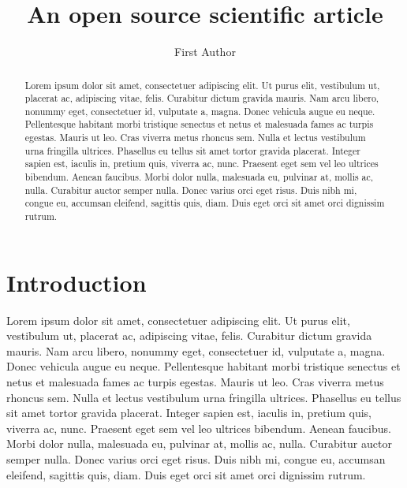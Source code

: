 \documentclass[twocolumn]{aastex631}
\begin{document}
\title{An open source scientific article}

\author{First Author}

\begin{abstract}
    Lorem ipsum dolor sit amet, consectetuer adipiscing elit. 
    Ut purus elit, vestibulum ut, placerat ac, adipiscing vitae, felis. 
    Curabitur dictum gravida mauris. 
    Nam arcu libero, nonummy eget, consectetuer id, vulputate a, magna. 
    Donec vehicula augue eu neque. 
    Pellentesque habitant morbi tristique senectus et netus et malesuada fames ac turpis egestas. 
    Mauris ut leo. 
    Cras viverra metus rhoncus sem. 
    Nulla et lectus vestibulum urna fringilla ultrices. 
    Phasellus eu tellus sit amet tortor gravida placerat. 
    Integer sapien est, iaculis in, pretium quis, viverra ac, nunc. 
    Praesent eget sem vel leo ultrices bibendum. 
    Aenean faucibus. 
    Morbi dolor nulla, malesuada eu, pulvinar at, mollis ac, nulla. 
    Curabitur auctor semper nulla. 
    Donec varius orci eget risus. 
    Duis nibh mi, congue eu, accumsan eleifend, sagittis quis, diam. 
    Duis eget orci sit amet orci dignissim rutrum.
\end{abstract}

\section{Introduction}
Lorem ipsum dolor sit amet, consectetuer adipiscing elit. 
Ut purus elit, vestibulum ut, placerat ac, adipiscing vitae, felis. 
Curabitur dictum gravida mauris. 
Nam arcu libero, nonummy eget, consectetuer id, vulputate a, magna. 
Donec vehicula augue eu neque. 
Pellentesque habitant morbi tristique senectus et netus et malesuada fames ac turpis egestas. 
Mauris ut leo. 
Cras viverra metus rhoncus sem. 
Nulla et lectus vestibulum urna fringilla ultrices. 
Phasellus eu tellus sit amet tortor gravida placerat. 
Integer sapien est, iaculis in, pretium quis, viverra ac, nunc. 
Praesent eget sem vel leo ultrices bibendum. 
Aenean faucibus. 
Morbi dolor nulla, malesuada eu, pulvinar at, mollis ac, nulla. 
Curabitur auctor semper nulla. 
Donec varius orci eget risus. 
Duis nibh mi, congue eu, accumsan eleifend, sagittis quis, diam. 
Duis eget orci sit amet orci dignissim rutrum.
\end{document}
